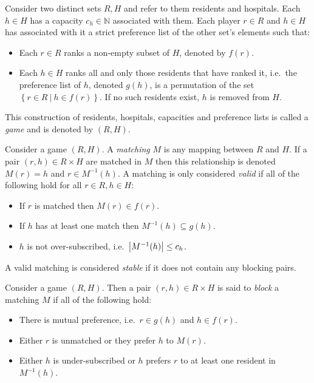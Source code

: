 \begin{definition}\label{def:game}
    Consider two distinct sets \(R, H\) and refer to them residents and
    hospitals. Each \(h \in H\) has a capacity \(c_h \in \mathbb{N}\) associated
    with them. Each player \(r \in R\) and \(h \in H\) has associated 
    with it a strict preference list of the other set's elements such that:
    \begin{itemize}
        \item Each \(r \in R\) ranks a non-empty subset of \(H\), denoted by
            \(f(r)\).
        \item Each \(h \in H\) ranks all and only those residents that have
            ranked it, i.e.\ the preference list of \(h\), denoted \(g(h)\), is
            a permutation of the set
            \(\left\{r \in R \ | \ h \in f(r)\right\}\). If no such residents
            exist, \(h\) is removed from \(H\).
    \end{itemize}
    This construction of residents, hospitals, capacities and preference lists
    is called a \emph{game} and is denoted by \((R, H)\).
\end{definition}
\begin{definition}\label{def:matching}
    Consider a game \((R, H)\). A \emph{matching} \(M\) is any mapping between
    \(R\) and \(H\). If a pair \((r, h) \in R \times H\) are matched in \(M\)
    then this relationship is denoted \(M(r) = h\) and \(r \in M^{-1}(h)\).
    A matching is only considered \emph{valid} if all of the following hold for
    all \(r \in R, h \in H\):
    \begin{itemize}
        \item If \(r\) is matched then \(M(r) \in f(r)\).
        \item If \(h\) has at least one match then \(M^{-1}(h) \subseteq g(h)\).
        \item \(h\) is not over-subscribed, i.e.\ \(\abs*{M^{-1}(h)} \leq c_h\).
    \end{itemize}
    A valid matching is considered \emph{stable} if it does not contain any
    blocking pairs.
\end{definition}
\begin{definition}\label{def:blocking}
    Consider a game \((R, H)\). Then a pair \((r, h) \in R \times H\) is said to
    \emph{block} a matching \(M\) if all of the following hold:
    \begin{itemize}
        \item There is mutual preference, i.e.\ \(r \in g(h)\) and \(h \in
            f(r)\).
        \item Either \(r\) is unmatched or they prefer \(h\) to \(M(r)\).
        \item Either \(h\) is under-subscribed or \(h\) prefers \(r\) to at
            least one resident in \(M^{-1}(h)\).
    \end{itemize}
\end{definition}